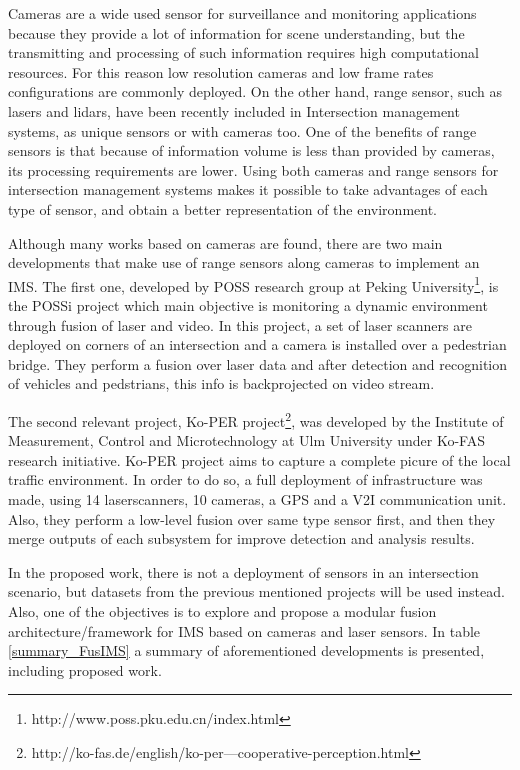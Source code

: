 Cameras are a wide used sensor for surveillance and monitoring applications because they provide a lot of information for scene understanding, but the transmitting and processing of such information requires high computational resources. For this reason low resolution cameras and low frame rates configurations are commonly deployed. On the other hand, range sensor, such as lasers and lidars, have been recently included in Intersection management systems, as unique sensors or with cameras too. One of the benefits of range sensors is that because of information volume is less than provided by cameras, its processing requirements are lower. Using both cameras and range sensors for intersection management systems makes it possible to take advantages of each type of sensor, and obtain a better representation of the environment.

Although many works based on cameras are found, there are two main developments that make use of range sensors along cameras to implement an IMS. The first one, developed by POSS research group at Peking University\footnote{http://www.poss.pku.edu.cn/index.html}, is the POSSi project which main objective is monitoring a dynamic environment through fusion of laser and video. In this project, a set of laser scanners are deployed on corners of an intersection and a camera is installed over a pedestrian bridge. They perform a fusion over laser data and after detection and recognition of vehicles and pedstrians, this info is backprojected on video stream.

The second relevant project, Ko-PER project\footnote{http://ko-fas.de/english/ko-per---cooperative-perception.html}, was developed by the Institute of Measurement, Control and Microtechnology at Ulm University under Ko-FAS research initiative. Ko-PER project aims to capture a complete picure of the local traffic environment. In order to do so, a full deployment of infrastructure was made, using 14 laserscanners, 10 cameras, a GPS and a V2I communication unit. Also, they perform a low-level fusion over same type sensor first, and then they merge outputs of each subsystem for improve detection and analysis results.

In the proposed work, there is not a deployment of sensors in an intersection scenario, but datasets from the previous mentioned projects will be used instead. Also, one of the objectives is to explore and propose a modular fusion architecture/framework for IMS based on cameras and laser sensors. In table \ref{summary_FusIMS} a summary of aforementioned developments is presented, including proposed work.

